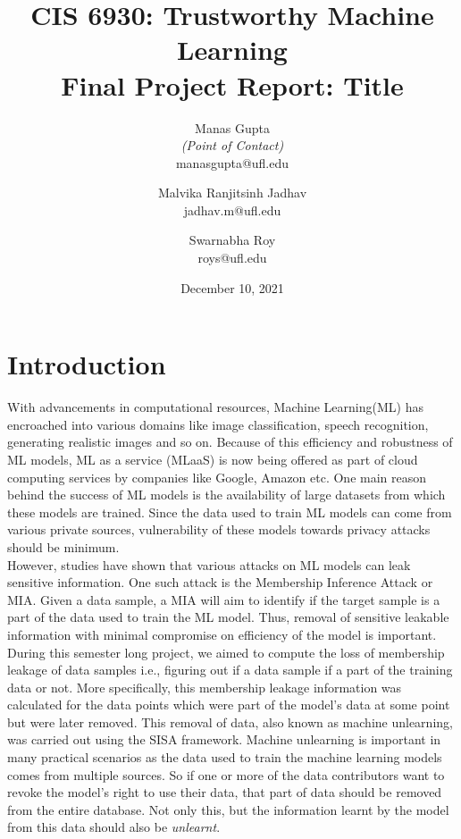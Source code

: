 \documentclass[11pt,letterpaper]{article}
\title{CIS 6930: Trustworthy Machine Learning\\
	\large Final Project Report: Title} %
\author{
        Manas Gupta \\{\em (Point of Contact)} \\
        manasgupta@ufl.edu\\
        \and
        Malvika Ranjitsinh Jadhav \\
        jadhav.m@ufl.edu\\
        \and
        Swarnabha Roy \\
        roys@ufl.edu\\
}
\date{December 10, 2021}
\begin{document}

\maketitle




\section{Introduction}
With advancements in computational resources, Machine Learning(ML) has encroached into various domains like image classification, speech recognition, generating realistic images and so on. Because of this
efficiency and robustness of ML models, ML as a service (MLaaS){\cite{Ribeiro2015MLaaSML}} is now being offered as part of cloud
computing services by companies like Google, Amazon etc. One main reason behind the success of ML
models is the availability of large datasets from which these models are trained. Since the data used to
train ML models can come from various private sources, vulnerability of these models towards privacy
attacks should be minimum.\\
However, studies have shown that various attacks on ML models can leak sensitive information. One such
attack is the Membership Inference Attack or MIA{\cite{shokri2017membership}}. Given a data sample, a MIA will aim to identify if
the target sample is a part of the data used to train the ML model. Thus, removal of sensitive leakable
information with minimal compromise on efficiency of the model is important.\\
During this semester long project, we aimed to compute the loss of membership leakage of data samples i.e., figuring out if a data sample if a part of the training data or not. More specifically, this membership leakage information was calculated for the data points which were part of the model's data at some point but were later removed. This removal of data, also known as machine unlearning, was carried out using the SISA framework. Machine unlearning is important in many practical scenarios as the data used to train the machine learning models comes from multiple sources. So if one or more of the data contributors want to revoke the model's right to use their data, that part of data should be removed from the entire database. Not only this, but the information learnt by the model from this data should also be \textit{unlearnt}. 
\end{document}
